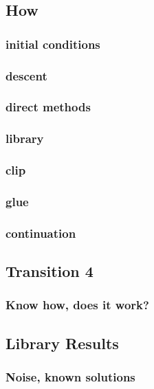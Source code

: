 \documentclass{article}
\begin{document}
		\subsection{How}
		    \subsubsection{initial conditions}
			\subsubsection{descent}
			\subsubsection{direct methods}
			\subsubsection{library}
			\subsubsection{clip}
			\subsubsection{glue}
            \subsubsection{continuation}
        \subsection{Transition 4}
            \subsubsection{Know how, does it work?}
        \subsection{}
		\subsection{Library Results}
			\subsubsection{Noise, known solutions}
\end{document}

